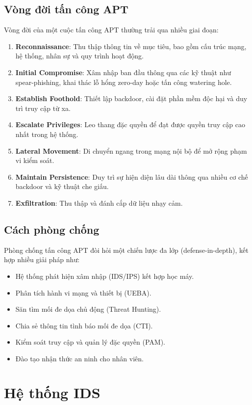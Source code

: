\subsection{Vòng đời tấn công APT}
Vòng đời của một cuộc tấn công APT thường trải qua nhiều giai đoạn:
\begin{enumerate}
    \item \textbf{Reconnaissance}: Thu thập thông tin về mục tiêu, bao gồm cấu trúc mạng, hệ thống, nhân sự và quy trình hoạt động.
    \item \textbf{Initial Compromise}: Xâm nhập ban đầu thông qua các kỹ thuật như spear-phishing, khai thác lỗ hổng zero-day hoặc tấn công watering hole.
    \item \textbf{Establish Foothold}: Thiết lập backdoor, cài đặt phần mềm độc hại và duy trì truy cập từ xa.
    \item \textbf{Escalate Privileges}: Leo thang đặc quyền để đạt được quyền truy cập cao nhất trong hệ thống.
    \item \textbf{Lateral Movement}: Di chuyển ngang trong mạng nội bộ để mở rộng phạm vi kiểm soát.
    \item \textbf{Maintain Persistence}: Duy trì sự hiện diện lâu dài thông qua nhiều cơ chế backdoor và kỹ thuật che giấu.
    \item \textbf{Exfiltration}: Thu thập và đánh cắp dữ liệu nhạy cảm.
\end{enumerate}

\subsection{Cách phòng chống}
Phòng chống tấn công APT đòi hỏi một chiến lược đa lớp (defense-in-depth), kết hợp nhiều giải pháp như:
\begin{itemize}
    \item Hệ thống phát hiện xâm nhập (IDS/IPS) kết hợp học máy.
    \item Phân tích hành vi mạng và thiết bị (UEBA).
    \item Săn tìm mối đe dọa chủ động (Threat Hunting).
    \item Chia sẻ thông tin tình báo mối đe dọa (CTI).
    \item Kiểm soát truy cập và quản lý đặc quyền (PAM).
    \item Đào tạo nhận thức an ninh cho nhân viên.
\end{itemize}

\section{Hệ thống IDS}
\label{sec:ids}

